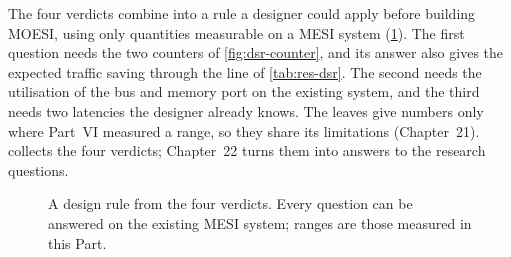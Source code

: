 The four verdicts combine into a rule a designer could apply before building MOESI,
using only quantities measurable on a MESI system (\cref{fig:res-rule}). The first
question needs the two counters of \cref{fig:dsr-counter}, and its answer also gives
the expected traffic saving through the line of \cref{tab:res-dsr}. The second needs
the utilisation of the bus and memory port on the existing system, and the third
needs two latencies the designer already knows. The leaves give numbers only where
Part~VI measured a range, so they share its limitations (Chapter~21).
 collects the four verdicts; Chapter~22 turns them into
answers to the research questions.

\begin{figure}[htbp]
\centering
{}
\caption[A design rule]{A design rule from the four verdicts. Every question can be
answered on the existing MESI system; ranges are those measured in this Part.}
\label{fig:res-rule}
\end{figure}

